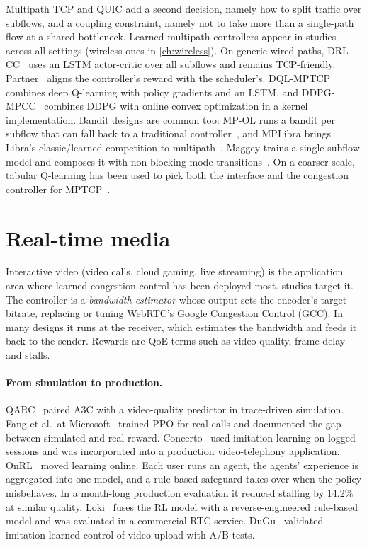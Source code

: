 Multipath TCP and QUIC add a second decision, namely how to split traffic over subflows, and a coupling constraint, namely not to take more than a single-path flow at a shared bottleneck. Learned multipath controllers appear in \nTopicMP{} studies across all settings (wireless ones in \cref{ch:wireless}). On generic wired paths, DRL-CC~\cite{xu2019drlcc} uses an LSTM actor-critic over all subflows and remains TCP-friendly. Partner~\cite{huang2020objective} aligns the controller's reward with the scheduler's. DQL-MPTCP~\cite{pokhrel2021learning} combines deep Q-learning with policy gradients and an LSTM, and DDPG-MPCC~\cite{pokhrel2024ddpg} combines DDPG with online convex optimization in a kernel implementation. Bandit designs are common too: MP-OL runs a bandit per subflow that can fall back to a traditional controller~\cite{zhuang2022achieving}, and MPLibra brings Libra's classic/learned competition to multipath~\cite{yu2024classic}. Maggey trains a single-subflow model and composes it with non-blocking mode transitions~\cite{wei2024breaking}. On a coarser scale, tabular Q-learning has been used to pick both the interface and the congestion controller for MPTCP~\cite{beig2018mptcp}.

\section{Real-time media}
\label{sec:rtc}

Interactive video (video calls, cloud gaming, live streaming) is the application area where learned congestion control has been deployed most. \nTopicRTC{} studies target it. The controller is a \emph{bandwidth estimator} whose output sets the encoder's target bitrate, replacing or tuning WebRTC's Google Congestion Control (GCC). In many designs it runs at the receiver, which estimates the bandwidth and feeds it back to the sender. Rewards are QoE terms such as video quality, frame delay and stalls.

\paragraph{From simulation to production.} QARC~\cite{huang2018qarc} paired A3C with a video-quality predictor in trace-driven simulation. Fang et al.\ at Microsoft~\cite{fang2019rtc} trained PPO for real calls and documented the gap between simulated and real reward. Concerto~\cite{zhou2019concerto} used imitation learning on logged sessions and was incorporated into a production video-telephony application. OnRL~\cite{zhang2020onrl} moved learning online. Each user runs an agent, the agents' experience is aggregated into one model, and a rule-based safeguard takes over when the policy misbehaves. In a month-long production evaluation it reduced stalling by 14.2\% at similar quality. Loki~\cite{zhang2021loki} fuses the RL model with a reverse-engineered rule-based model and was evaluated in a commercial RTC service. DuGu~\cite{huang2022learned} validated imitation-learned control of video upload with A/B tests.

